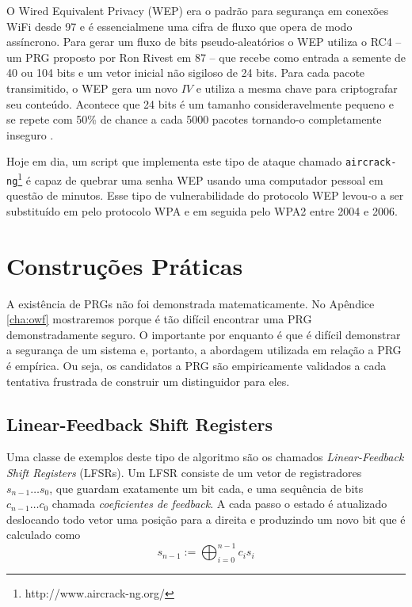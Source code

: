 
\begin{example}
O Wired Equivalent Privacy (WEP) era o padrão para segurança em conexões WiFi desde 97 e é essencialmene uma cifra de fluxo que opera de modo assíncrono.
Para gerar um fluxo de bits pseudo-aleatórios o WEP utiliza o RC4 \cite{Rivest16} -- um PRG proposto por Ron Rivest em 87 -- que recebe como entrada a semente de 40 ou 104 bits e um vetor inicial não sigiloso de 24 bits.
Para cada pacote transimitido, o WEP gera um novo $IV$ e utiliza a mesma chave para criptografar seu conteúdo.
Acontece que 24 bits é um tamanho consideravelmente pequeno e se repete com 50\% de chance a cada 5000 pacotes tornando-o completamente inseguro \cite{Fluhrer01}.

Hoje em dia, um script que implementa este tipo de ataque chamado {\tt aircrack-ng}\footnote{http://www.aircrack-ng.org/} é capaz de quebrar uma senha WEP usando uma computador pessoal em questão de minutos.
Esse tipo de vulnerabilidade do protocolo WEP levou-o a ser substituído em pelo protocolo WPA e em seguida pelo WPA2 entre 2004 e 2006.
\end{example}

\section{Construções Práticas}
\label{sec:construcoes-praticas}

A existência de PRGs não foi demonstrada matematicamente.
No Apêndice \ref{cha:owf} mostraremos porque é tão difícil encontrar uma PRG demonstradamente seguro.
O importante por enquanto é que é difícil demonstrar a segurança de um sistema e, portanto, a abordagem utilizada em relação a PRG é empírica.
Ou seja, os candidatos a PRG são empiricamente validados a cada tentativa frustrada de construir um distinguidor para eles.


\subsection{Linear-Feedback Shift Registers}
\label{sec:lfsr}

Uma classe de exemplos deste tipo de algoritmo são os chamados {\em Linear-Feedback Shift Registers} (LFSRs).
Um LFSR consiste de um vetor de registradores $s_{n-1} \dots s_0$, que guardam exatamente um bit cada, e uma sequência de bits $c_{n-1} \dots c_0$ chamada {\em coeficientes de feedback}.
A cada passo o estado é atualizado deslocando todo vetor uma posição para a direita e produzindo um novo bit que é calculado como
\begin{displaymath}
s_{n-1} := \bigoplus_{i=0}^{n-1}c_is_i  
\end{displaymath}

